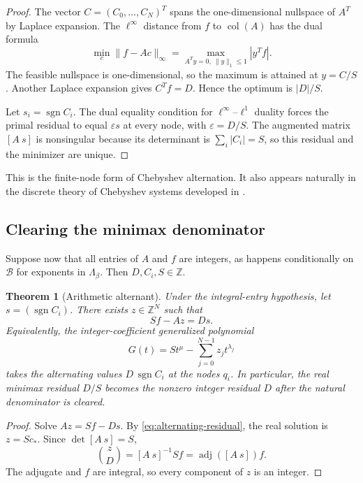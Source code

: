 \documentclass[11pt,oneside]{article}
\newtheorem{theorem}{Theorem}[section]
\theoremstyle{definition}
\theoremstyle{remark}
\newcommand{\Z}{\mathbb Z}
\newcommand{\Bsem}{\mathcal B}
\newcommand{\Lsem}{\Lambda}
\newcommand{\sgn}{\operatorname{sgn}}
\begin{document}
\begin{proof}
The vector $C=(C_0,\ldots,C_N)^T$ spans the one-dimensional nullspace of $A^T$ by Laplace
expansion.  The $\ell^\infty$ distance from $f$ to $\operatorname{col}(A)$ has the dual
formula
\[
 \min_c\|f-Ac\|_\infty
 =\max_{A^Ty=0,\ \|y\|_1\le1}|y^Tf|.
\]
The feasible nullspace is one-dimensional, so the maximum is attained at
$y=C/S$.  Another Laplace expansion gives $C^Tf=D$.  Hence the optimum is $|D|/S$.

Let $s_i=\sgn C_i$.  The dual equality condition for $\ell^\infty$--$\ell^1$ duality forces
the primal residual to equal $\varepsilon s$ at every node, with
$\varepsilon=D/S$.  The augmented matrix $[A\ s]$ is nonsingular because its determinant is
$\sum_i|C_i|=S$, so this residual and the minimizer are unique.
\end{proof}

This is the finite-node form of Chebyshev alternation.  It also appears naturally in the
discrete theory of Chebyshev systems developed in \cite{GorbachevIvanovTikhonov2025}.

\subsection{Clearing the minimax denominator}

Suppose now that all entries of $A$ and $f$ are integers, as happens conditionally on
$\Bsem$ for exponents in $\Lsem_\beta$.  Then $D,C_i,S\in\Z$.

\begin{theorem}[Arithmetic alternant]
\label{thm:arithmetic-alternant}
Under the integral-entry hypothesis, let $s=(\sgn C_i)$.  There exists
$z\in\Z^N$ such that
\begin{equation}
 Sf-Az=D s.
 \label{eq:integer-alternant}
\end{equation}
Equivalently, the integer-coefficient generalized polynomial
\[
 G(t)=S t^\mu-\sum_{j=0}^{N-1}z_jt^{\lambda_j}
\]
takes the alternating values $D\,\sgn C_i$ at the nodes $q_i$.
In particular, the real minimax residual $D/S$ becomes the nonzero integer residual $D$
after the natural denominator is cleared.
\end{theorem}

\begin{proof}
Solve $Az=Sf-Ds$.  By \eqref{eq:alternating-residual}, the real solution is $z=Sc_*$.  Since
$\det[A\ s]=S$,
\[
 \binom{z}{D}=[A\ s]^{-1}Sf=\operatorname{adj}([A\ s])f.
\]
The adjugate and $f$ are integral, so every component of $z$ is an integer.
\end{proof}
\end{document}
